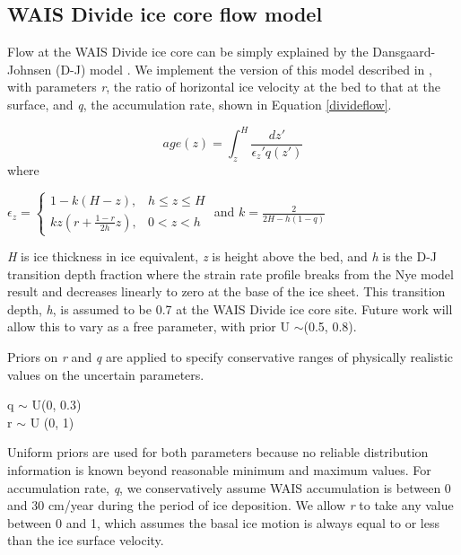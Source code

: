 \documentclass[12pt]{article}
\begin{document}
\subsection{WAIS Divide ice core flow model}
Flow at the WAIS Divide ice core can be simply explained by the Dansgaard-Johnsen (D-J) model \citep{dansgaardjohnsen1969}. We implement the version of this model described in \citet{schwander2001}, with parameters \textit{r}, the ratio of horizontal ice velocity at the bed to that at the surface, and \textit{q}, the accumulation rate, shown in Equation \ref{divideflow}. %

\begin{equation}\label{divideflow}
age(z) = \int_{z}^{H} \frac{dz'}{\epsilon_z' q(z')}
\end{equation}
where
\begin{center}
$    \epsilon_z=
    \begin{cases}
                 1-k(H-z), & h \leq z \leq H \\
                  kz(r+\frac{1-r}{2h}z), & 0 < z < h
    \end{cases}
$
and
$
k = \frac{2}{2H - h(1-q)}
$
\end{center}
\textit{H} is ice thickness in ice equivalent, \textit{z} is height above the bed, and \textit{h} is the D-J transition depth fraction where the strain rate profile breaks from the Nye model result and decreases linearly to zero at the base of the ice sheet. This transition depth, \textit{h}, is assumed to be 0.7 at the WAIS Divide ice core site. Future work will allow this to vary as a free parameter, with prior U $\sim$(0.5, 0.8).

Priors on \textit{r} and \textit{q} are applied to specify conservative ranges of physically realistic values on the uncertain parameters. 

\begin{center}
q $\sim$ U(0, 0.3) \\
r $\sim$ U (0, 1)
\end{center}
Uniform priors are used for both parameters because no reliable distribution information is known beyond reasonable minimum and maximum values. For accumulation rate, \textit{q}, we conservatively assume WAIS accumulation is between 0 and 30 cm/year during the period of ice deposition.  We allow \textit{r} to take any value between 0 and 1, which assumes the basal ice motion is always equal to or less than the ice surface velocity. 
\end{document}
